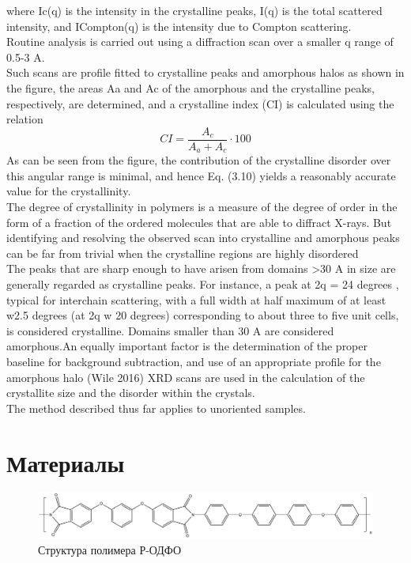 where Ic(q) is the intensity in the crystalline peaks, I(q) is the total scattered
intensity, and ICompton(q) is the intensity due to Compton scattering.\\
Routine analysis is carried out using a diffraction
scan over a smaller q range of 0.5-3 A.\\
Such scans are profile fitted to crystalline peaks and amorphous halos
as shown in the figure, the areas Aa and Ac of the amorphous and the crystalline
peaks, respectively, are determined, and a crystalline index (CI) is calculated using
the relation
\[
CI = \frac{A_c}{A_a+A_c} \cdot 100
\]
As can be seen from the figure, the contribution of the crystalline disorder over this
angular range is minimal, and hence Eq. (3.10) yields a reasonably accurate value for
the crystallinity.\\
The degree of crystallinity in polymers is a measure of the degree of order in the
form of a fraction of the ordered molecules that are able to diffract X-rays. But
identifying and resolving the observed scan into crystalline and amorphous peaks
can be far from trivial when the crystalline regions are highly disordered\\
The peaks that are sharp enough to have arisen from domains >30 A
in size are
generally regarded as crystalline peaks. For instance, a peak at 2q = 24 degrees , typical for interchain scattering, with a full width at half maximum of at least w2.5 degrees (at 2q w 20 degrees) corresponding to about
three to five unit cells, is considered crystalline. Domains smaller than 30 A are considered amorphous.An equally important factor is the determination of the
proper baseline for background subtraction, and use of an appropriate profile for
the amorphous halo (Wile 2016)
XRD scans are used in the calculation of
the crystallite size and the disorder within the crystals.\\
The method described thus far applies to unoriented samples.\\




\section{Материалы}

		
	\begin{figure}[h]
	\includegraphics[width=\textwidth]{fig/formula.png}
	\caption{Структура полимера Р-ОДФО \cite{pi-formula}}
	\label{fig:formula}
	\end{figure}



